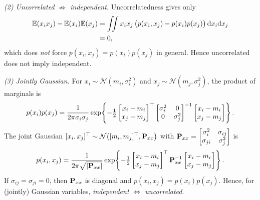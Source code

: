 \emph{(2) Uncorrelated $\not\Rightarrow$ independent.} Uncorrelatedness gives only
\begin{align}
\mathbb{E}(x_i x_j) - \mathbb{E}(x_i)\mathbb{E}(x_j)
&= \iint x_i x_j\,\big(p(x_i,x_j) - p(x_i)p(x_j)\big)\,\mathrm{d}x_i\mathrm{d}x_j \\
&= 0,
\end{align}
which does \emph{not} force $p(x_i,x_j) = p(x_i)p(x_j)$ in general. Hence uncorrelated does not imply independent.

\emph{(3) Jointly Gaussian.} For $x_i\sim\mathcal{N}(m_i,\sigma_i^2)$ and $x_j\sim\mathcal{N}(m_j,\sigma_j^2)$, the product of marginals is
\begin{align}
p(x_i)p(x_j) = \frac{1}{2\pi\sigma_i\sigma_j}\exp\!\left\{-\tfrac{1}{2}\begin{bmatrix} x_i-m_i \\ x_j-m_j \end{bmatrix}^\top
\begin{bmatrix} \sigma_i^2 & 0 \\ 0 & \sigma_j^2 \end{bmatrix}^{-1}
\begin{bmatrix} x_i-m_i \\ x_j-m_j \end{bmatrix}\right\}.
\end{align}
The joint Gaussian $[x_i,x_j]^\top\sim\mathcal{N}\big([m_i,m_j]^\top,\boldsymbol{\mathbf{P}}_{xx}\big)$ with $\boldsymbol{\mathbf{P}}_{xx} = \begin{bmatrix} \sigma_i^2 & \sigma_{ij} \\ \sigma_{ji} & \sigma_j^2 \end{bmatrix}$ is
\begin{align}
p(x_i,x_j) = \frac{1}{2\pi\sqrt{|\boldsymbol{\mathbf{P}}_{xx}|}}\exp\!\left\{-\tfrac{1}{2}\begin{bmatrix} x_i-m_i \\ x_j-m_j \end{bmatrix}^\top
\boldsymbol{\mathbf{P}}_{xx}^{-1}
\begin{bmatrix} x_i-m_i \\ x_j-m_j \end{bmatrix}\right\}.
\end{align}
If $\sigma_{ij}=\sigma_{ji}=0$, then $\boldsymbol{\mathbf{P}}_{xx}$ is diagonal and $p(x_i,x_j)=p(x_i)p(x_j)$. Hence, for (jointly) Gaussian variables, \emph{independent $\Leftrightarrow$ uncorrelated}.

